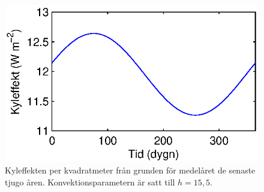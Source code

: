 \begin{figure}
\centering
\includegraphics{images/groundcool.eps}
\caption{\label{fig:cooling_ground}
Kyleffekten per kvadratmeter från grunden för medelåret de senaste tjugo åren. Konvektionsparametern är satt till $h=15,5$. }

\end{figure}

